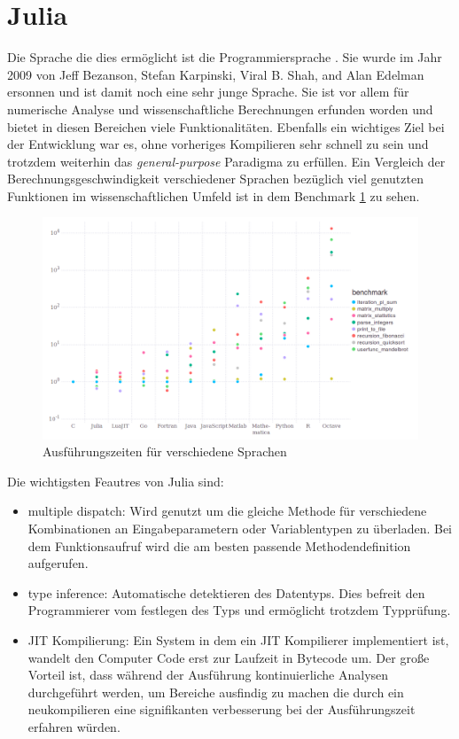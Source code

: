 \documentclass{like}
\begin{document}
\section{Julia}
Die Sprache die dies ermöglicht ist die Programmiersprache . Sie wurde im Jahr 2009 von Jeff Bezanson, Stefan Karpinski, Viral B. Shah, and Alan Edelman ersonnen und ist damit noch eine sehr junge Sprache. Sie ist vor allem für numerische Analyse und wissenschaftliche Berechnungen erfunden worden und bietet in diesen Bereichen viele Funktionalitäten. Ebenfalls ein wichtiges Ziel bei der Entwicklung war es, ohne vorheriges Kompilieren sehr schnell zu sein und trotzdem weiterhin das \textit{general-purpose} Paradigma zu erfüllen. Ein Vergleich der Berechnungsgeschwindigkeit verschiedener Sprachen bezüglich viel genutzten Funktionen im wissenschaftlichen Umfeld ist in dem Benchmark \ref{fig:juliaBench} zu sehen.

\begin{figure}[ht!]
	\includegraphics[width=450pt]{Abbildungen/juliaBenchmark.png}
	\caption{Ausführungszeiten für verschiedene Sprachen}
	\label{fig:juliaBench}
\end{figure}

Die wichtigsten Feautres von Julia sind:
\begin{itemize}

	\item multiple dispatch: Wird genutzt um die gleiche Methode für verschiedene Kombinationen an Eingabeparametern oder Variablentypen zu überladen. Bei dem Funktionsaufruf wird die am besten passende Methodendefinition aufgerufen. \\
	\item type inference: Automatische detektieren des Datentyps. Dies befreit den Programmierer vom festlegen des Typs und ermöglicht trotzdem Typprüfung. \\
	\item \ac{JIT} Kompilierung: Ein System in dem ein \ac{JIT} Kompilierer implementiert ist, wandelt den Computer Code erst zur Laufzeit in Bytecode um. Der große Vorteil ist, dass während der Ausführung kontinuierliche Analysen durchgeführt werden, um Bereiche ausfindig zu machen die durch ein neukompilieren eine signifikanten verbesserung bei der Ausführungszeit erfahren würden. \\
\end{itemize}
\end{document}

